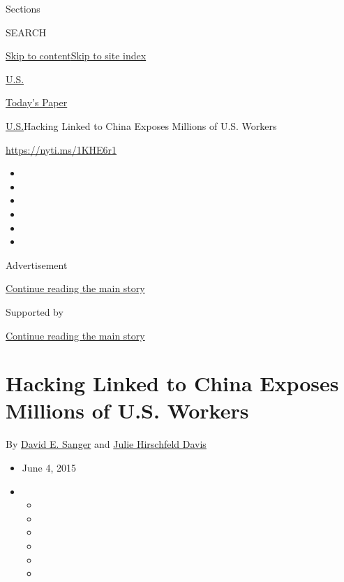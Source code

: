 Sections

SEARCH

\protect\hyperlink{site-content}{Skip to
content}\protect\hyperlink{site-index}{Skip to site index}

\href{https://www.nytimes.com/section/us}{U.S.}

\href{https://myaccount.nytimes.com/auth/login?response_type=cookie\&client_id=vi}{}

\href{https://www.nytimes.com/section/todayspaper}{Today's Paper}

\href{/section/us}{U.S.}\textbar{}Hacking Linked to China Exposes
Millions of U.S. Workers

\href{https://nyti.ms/1KHE6r1}{https://nyti.ms/1KHE6r1}

\begin{itemize}
\item
\item
\item
\item
\item
\item
\end{itemize}

Advertisement

\protect\hyperlink{after-top}{Continue reading the main story}

Supported by

\protect\hyperlink{after-sponsor}{Continue reading the main story}

\hypertarget{hacking-linked-to-china-exposes-millions-of-us-workers}{%
\section{Hacking Linked to China Exposes Millions of U.S.
Workers}\label{hacking-linked-to-china-exposes-millions-of-us-workers}}

By \href{http://www.nytimes.com/by/david-e-sanger}{David E. Sanger} and
\href{https://www.nytimes.com/by/julie-hirschfeld-davis}{Julie
Hirschfeld Davis}

\begin{itemize}
\item
  June 4, 2015
\item
  \begin{itemize}
  \item
  \item
  \item
  \item
  \item
  \item
  \end{itemize}
\end{itemize}

